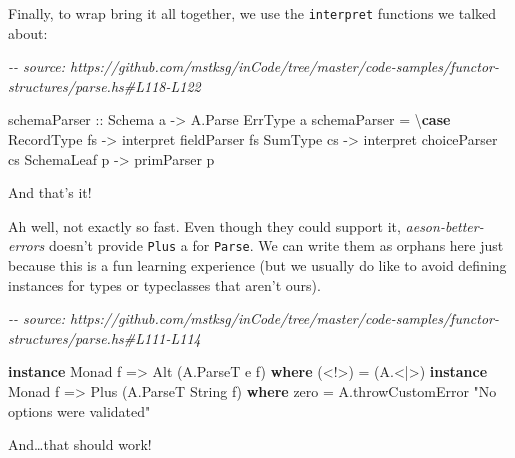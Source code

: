 \documentclass[]{article}
\newenvironment{Shaded}{}{}
\newcommand{\CommentTok}[1]{\textcolor[rgb]{0.38,0.63,0.69}{\textit{#1}}}
\newcommand{\DataTypeTok}[1]{\textcolor[rgb]{0.56,0.13,0.00}{#1}}
\newcommand{\KeywordTok}[1]{\textcolor[rgb]{0.00,0.44,0.13}{\textbf{#1}}}
\newcommand{\NormalTok}[1]{#1}
\newcommand{\OperatorTok}[1]{\textcolor[rgb]{0.40,0.40,0.40}{#1}}
\newcommand{\OtherTok}[1]{\textcolor[rgb]{0.00,0.44,0.13}{#1}}
\newcommand{\StringTok}[1]{\textcolor[rgb]{0.25,0.44,0.63}{#1}}
\begin{document}
Finally, to wrap bring it all together, we use the \texttt{interpret} functions
we talked about:

\begin{Shaded}
\begin{Highlighting}[]
\CommentTok{{-}{-} source: https://github.com/mstksg/inCode/tree/master/code{-}samples/functor{-}structures/parse.hs\#L118{-}L122}

\OtherTok{schemaParser ::} \DataTypeTok{Schema}\NormalTok{ a }\OtherTok{{-}>} \DataTypeTok{A.Parse} \DataTypeTok{ErrType}\NormalTok{ a}
\NormalTok{schemaParser }\OtherTok{=}\NormalTok{ \textbackslash{}}\KeywordTok{case}
    \DataTypeTok{RecordType}\NormalTok{ fs }\OtherTok{{-}>}\NormalTok{ interpret fieldParser fs}
    \DataTypeTok{SumType}\NormalTok{    cs }\OtherTok{{-}>}\NormalTok{ interpret choiceParser cs}
    \DataTypeTok{SchemaLeaf}\NormalTok{ p  }\OtherTok{{-}>}\NormalTok{ primParser p}
\end{Highlighting}
\end{Shaded}

And that's it!

Ah well, not exactly so fast. Even though they could support it,
\emph{aeson-better-errors} doesn't provide \texttt{Plus} a for \texttt{Parse}.
We can write them as orphans here just because this is a fun learning experience
(but we usually do like to avoid defining instances for types or typeclasses
that aren't ours).

\begin{Shaded}
\begin{Highlighting}[]
\CommentTok{{-}{-} source: https://github.com/mstksg/inCode/tree/master/code{-}samples/functor{-}structures/parse.hs\#L111{-}L114}

\KeywordTok{instance} \DataTypeTok{Monad}\NormalTok{ f }\OtherTok{=>} \DataTypeTok{Alt}\NormalTok{ (}\DataTypeTok{A.ParseT}\NormalTok{ e f) }\KeywordTok{where}
\NormalTok{    (}\OperatorTok{<!>}\NormalTok{) }\OtherTok{=}\NormalTok{ (}\OperatorTok{A.<|>}\NormalTok{)}
\KeywordTok{instance} \DataTypeTok{Monad}\NormalTok{ f }\OtherTok{=>} \DataTypeTok{Plus}\NormalTok{ (}\DataTypeTok{A.ParseT} \DataTypeTok{String}\NormalTok{ f) }\KeywordTok{where}
\NormalTok{    zero  }\OtherTok{=}\NormalTok{ A.throwCustomError }\StringTok{"No options were validated"}
\end{Highlighting}
\end{Shaded}

And\ldots that should work!
\end{document}
